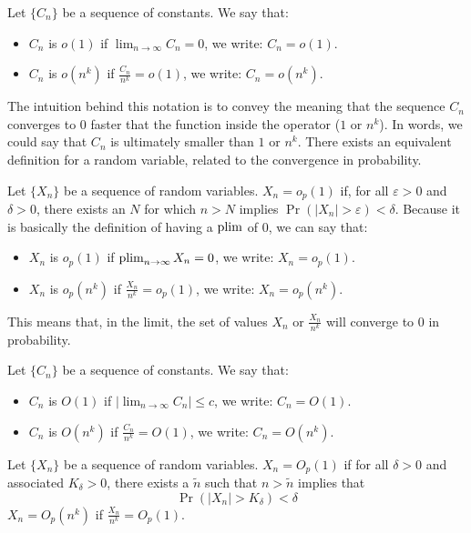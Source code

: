 \begin{definition}
Let $\{ C_n\}$ be a sequence of constants. We say that: \begin{itemize}
\item $C_n$ is $o(1)$ if $\lim_{n\to\infty} C_n = 0$, we write: $C_n = o(1)$.
\item $C_n$ is $o(n^k)$ if $\frac{C_n}{n^k}=o(1)$, we write: $C_n = o(n^k)$.
\end{itemize}
\end{definition} The intuition behind this notation is to convey the meaning that the sequence $C_n$ converges to $0$ faster that the function inside the operator ($1$ or $n^k$). In words, we could say that $C_n$ is ultimately smaller than $1$ or $n^k$. There exists an equivalent definition for a random variable, related to the convergence in probability.
\begin{definition}
Let $\{ X_n\}$ be a sequence of random variables. $X_n = o_p(1)$ if, for all $\varepsilon >0$ and $\delta >0$, there exists an $N$ for which $n>N$ implies $\operatorname{Pr}(\lvert X_n\rvert > \varepsilon)<\delta$. Because it is basically the definition of having a $\operatorname{plim}$ of $0$, we can say that: \begin{itemize}
\item $X_n$ is $o_p(1)$ if $\operatorname{plim}_{n\to\infty} X_n = 0$, we write: $X_n = o_p(1)$.
\item $X_n$ is $o_p(n^k)$ if $\frac{X_n}{n^k}=o_p(1)$, we write: $X_n = o_p(n^k)$.
\end{itemize}
\end{definition}
This means that, in the limit, the set of values $X_n$ or $\frac{X_n}{n^k}$ will converge to $0$ in probability.

\begin{definition} 
Let $\{ C_n\}$ be a sequence of constants. We say that: \begin{itemize}
\item $C_n$ is $O(1)$ if $\lvert\lim_{n\to\infty} C_n\rvert \leq c$, we write: $C_n = O(1)$.
\item $C_n$ is $O(n^k)$ if $\frac{C_n}{n^k} = O(1)$, we write: $C_n = O(n^k)$.
\end{itemize}
\end{definition}

\begin{definition}
Let $\{ X_n\}$ be a sequence of random variables. $X_n=O_p(1)$ if for all $\delta >0$ and associated $K_{\delta}>0$, there exists a $\tilde{n}$ such that $n>\tilde{n}$ implies that $$\operatorname{Pr}(\lvert X_n\rvert > K_{\delta})<\delta$$ $X_n=O_p(n^k)$ if $\frac{X_n}{n^k}=O_p(1)$.
\end{definition}

